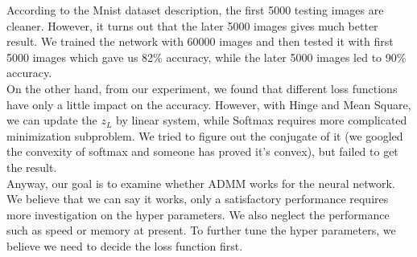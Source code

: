 \documentclass{article}
\begin{document}
According to the Mnist dataset description, the first 5000 testing images are cleaner. However, it turns out that the later 5000 images gives much better result. We trained the network with 60000 images and then tested it with first 5000 images which gave us 82\%  accuracy, while the later 5000 images led to 90\% accuracy.\\ 

On the other hand, from our experiment, we found that different loss functions have only a little impact on the accuracy. However,  with Hinge and Mean Square, we can update the $z_L$ by linear system, while Softmax requires more complicated minimization subproblem. We tried to figure out the conjugate of it (we googled the convexity of softmax and someone has proved it's convex), but failed to get the result. \\

Anyway, our goal is to examine whether ADMM works for the neural network. We believe that we can say it works, only a satisfactory performance requires more investigation on the hyper parameters. We also neglect the performance such as speed or memory at present. To further tune the hyper parameters, we believe we need to decide the loss function first. 
\end{document}
